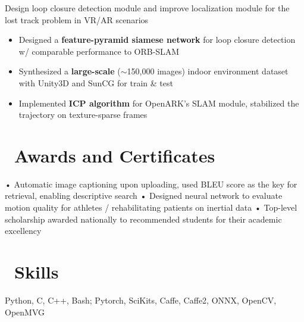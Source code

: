 \documentclass{resume}
\begin{document}
Design loop closure detection module and improve localization module for the lost track problem in VR/AR scenarios
\begin{itemize}
  \item Designed a \textbf{feature-pyramid siamese network} for loop closure detection w/ comparable performance to ORB-SLAM
  \item Synthesized a \textbf{large-scale} ($\sim$150,000 images) indoor environment dataset with Unity3D and SunCG for train \& test
  \item Implemented \textbf{ICP algorithm} for OpenARK's SLAM module, stabilized the trajectory on texture-sparse frames
\end{itemize}

\section{\faHeartO\ Awards and Certificates}
{• Automatic image captioning upon uploading, used BLEU score as the key for retrieval, enabling descriptive search}\vspace{0.8mm}
{•  Designed neural network to evaluate motion quality for athletes / rehabilitating patients on inertial data}\vspace{0.8mm}
{•  Top-level scholarship awarded nationally to recommended students for their academic excellency}{\vspace{0.8mm}}

\section{\faDesktop\ Skills}
Python, C, C++, Bash; Pytorch, SciKits, Caffe, Caffe2, ONNX, OpenCV, OpenMVG
\end{document}
